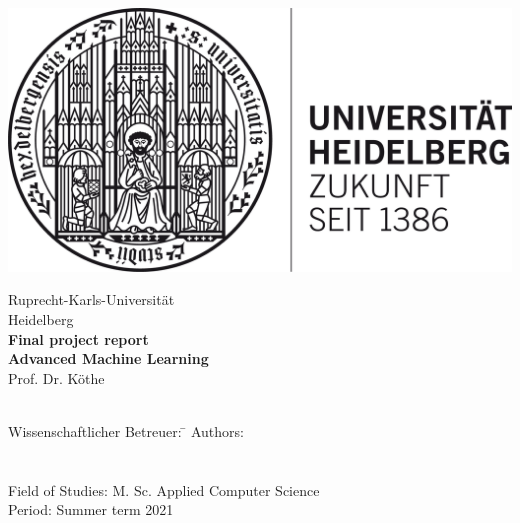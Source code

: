 \begin{titlepage}
\begin{minipage}{\textwidth}
		\vspace{-2cm}
		\centering
		 \includegraphics[scale=0.35]{img/uni_blacksmall.png}
\end{minipage}
\vspace{6em}
\sffamily
\begin{center}
	\textsf{\large{}Ruprecht-Karls-Universität \\ Heidelberg}\\[2em]
	\textsf{\textbf{\Large{}Final project report}}\\[3mm]
	\textsf{\textbf{Advanced Machine Learning}} \\[3mm] \textsf{Prof. Dr. Köthe} \\[1.5cm]
	\textsf{\textbf{\Large{}\DerTitelDerArbeit}}\\[1.5cm]

	
	\vspace{3em}
\vfill

\begin{minipage}{\textwidth}

\begin{tabbing}
	Wissenschaftlicher Betreuer: \hspace{0.85cm}\=\kill
	Authors: \> \DerAutorDerArbeit \\ \> \DerZweiteAutorDerArbeit \\ \>  \DerDritteAutorDerArbeit \\ [1.5mm]
	Field of Studies: \> M. Sc. Applied Computer Science \\[1.5mm]
	Period: \> Summer term 2021
\end{tabbing}
\end{minipage}

\end{center}

\end{titlepage}